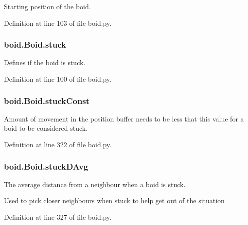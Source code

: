 Starting position of the boid. 



Definition at line 103 of file boid.\-py.

\hypertarget{classboid_1_1Boid_a099882fd7d72bfd06c15ec20b0425905}{
\subsubsection[{stuck}]{\setlength{\rightskip}{0pt plus 5cm}boid.\-Boid.\-stuck}}\label{classboid_1_1Boid_a099882fd7d72bfd06c15ec20b0425905}


Defines if the boid is stuck. 



Definition at line 100 of file boid.\-py.

\hypertarget{classboid_1_1Boid_abbcf546137204a45278b6caa95c4378b}{
\subsubsection[{stuck\-Const}]{\setlength{\rightskip}{0pt plus 5cm}boid.\-Boid.\-stuck\-Const}}\label{classboid_1_1Boid_abbcf546137204a45278b6caa95c4378b}


Amount of movement in the position buffer needs to be less that this value for a boid to be considered stuck. 



Definition at line 322 of file boid.\-py.

\hypertarget{classboid_1_1Boid_a663164af1a20323f49e002d7576914f7}{
\subsubsection[{stuck\-D\-Avg}]{\setlength{\rightskip}{0pt plus 5cm}boid.\-Boid.\-stuck\-D\-Avg}}\label{classboid_1_1Boid_a663164af1a20323f49e002d7576914f7}


The average distance from a neighbour when a boid is stuck. 

Used to pick closer neighbours when stuck to help get out of the situation 

Definition at line 327 of file boid.\-py.

